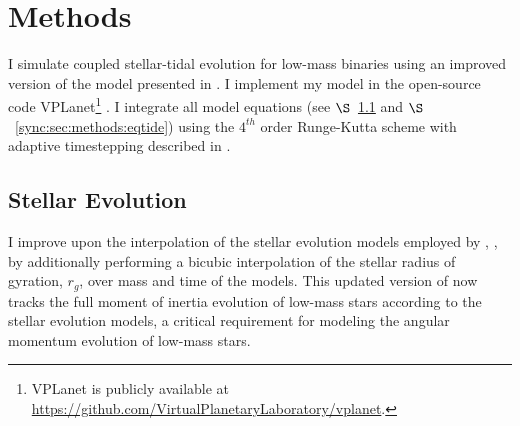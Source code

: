 
\section{Methods} \label{sync:sec:methods}

I simulate coupled stellar-tidal evolution for low-mass binaries using an improved version of the model presented in \citet{Fleming2018}.  I implement my model in the open-source code VPLanet\footnote{VPLanet is publicly available
at \href{https://github.com/VirtualPlanetaryLaboratory/vplanet}{{https://github.com/VirtualPlanetaryLaboratory/vplanet}}.} \citep{Barnes2019}.  I integrate all model equations (see $\S$~\ref{sync:sec:methods:stellar} and $\S$~\ref{sync:sec:methods:eqtide}) using the $4^{th}$ order Runge-Kutta scheme with adaptive timestepping described in \citet{Fleming2018}.  

\subsection{Stellar Evolution} \label{sync:sec:methods:stellar}

I improve upon the interpolation of the \citet{Baraffe2015} stellar evolution models employed by \citet{Fleming2018}, \stellar, by additionally performing a bicubic interpolation of the stellar radius of gyration, $r_g$, over mass and time of the \citet{Baraffe2015} models. This updated version of \stellar now tracks the full moment of inertia evolution of low-mass stars according to the \citet{Baraffe2015} stellar evolution models, a critical requirement for modeling the angular momentum evolution of low-mass stars. 

